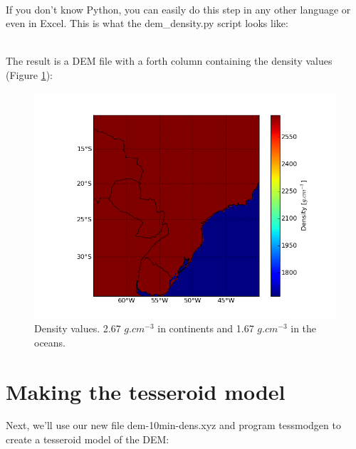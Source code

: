 \documentclass[a4paper]{article}
\begin{document}


\hfill\\
\noindent If you don't know Python, you can easily do this step in any other language or
even in Excel. This is what the dem\_density.py script looks like:



\hfill\\
The result is a DEM file with a forth column containing the density values
(Figure \ref{fig:dem-dens}):



\begin{figure}[htb]
    \centering
        \includegraphics[width=\textwidth]{dem-10min-dens.png}
    \caption{Density values. 2.67 $g.cm^{-3}$ in continents and 1.67 $g.cm^{-3}$
             in the oceans.
    \label{fig:dem-dens}}
\end{figure}

\section{Making the tesseroid model}

Next, we'll use our new file dem-10min-dens.xyz and program tessmodgen to create
a tesseroid model of the DEM:


\end{document}
